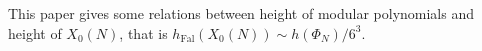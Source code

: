 \documentclass[a4paper, twoside]{article}
\begin{document}



This paper gives some relations between height of modular polynomials and height of $X_{0}(N)$, that is $h_{\mathrm{Fal}}(X_{0}(N))\sim h(\Phi_{N})/6^{3}$.






\end{document}
